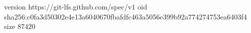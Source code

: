 version https://git-lfs.github.com/spec/v1
oid sha256:c0fa3d50302e4e13a6040670fbafdfc463a5056e399b92a774274753ea6403f4
size 87420
